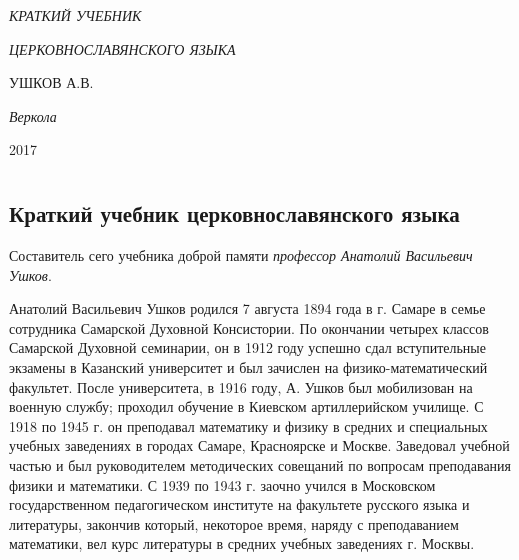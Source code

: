 \documentclass[11pt,a4paper,oneside]{memoir}
\newcommand*{\labelit}[1]{\phantomsection\label{#1}}
\newlength{\tpheight}\setlength{\tpheight}{0.9\textheight}
\newlength{\txtheight}\setlength{\txtheight}{0.9\tpheight}
\newlength{\tpwidth}\setlength{\tpwidth}{0.9\textwidth}
\newlength{\txtwidth}\setlength{\txtwidth}{0.9\tpwidth}
\newlength{\drop}
\newenvironment{showtitle}{%
    \begin{boxminipage}[c][\tpheight]{\tpwidth}
        \centering\begin{vplace}\begin{minipage}[c][\txtheight]{\txtwidth}}%
            {\end{minipage}\end{vplace}\end{boxminipage}}
\newcommand*{\titleCC}{\begingroup%
    \drop=0.1\txtheight
    \vspace*{\drop}
    \centering 
    {\Large\itshape КРАТКИЙ УЧЕБНИК}\\[0.5\drop]
    {\textcolor{Red}{\HUGE\bfseries {\slv{✠}}}}\par
    \vspace{\drop}
    {\LARGE\itshape ЦЕРКОВНОСЛАВЯНСКОГО ЯЗЫКА}\par
    \vfill
    {\Large УШКОВ А.В.}\par
    \vfill
    {\itshape Веркола}\par
    {\scshape 2017}\par
    \vspace*{\drop}
    \endgroup}
\begin{document}
    \begin{titlingpage}
        \begin{showtitle}
            \titleCC
        \end{showtitle}
        \labelit{CC}
        {
            \par\vspace{0.2\baselineskip}
        }
    \end{titlingpage}
    
    \tableofcontents*
    
    \chapter*{}
        \section*{Краткий учебник церковнославянского языка}
        \label{sec:brief}
    
    Составитель сего учебника доброй памяти \emph{профессор Анатолий Васильевич Ушков}.
    
    Анатолий Васильевич Ушков родился 7 августа 1894 года в г. Самаре в семье сотрудника Самарской Духовной Консистории. По окончании четырех классов Самарской Духовной семинарии, он в 1912 году успешно сдал вступительные экзамены в Казанский университет и был зачислен на физико-математический факультет. После университета, в 1916 году, А. Ушков был мобилизован на военную службу; проходил обучение в Киевском артиллерийском училище. С 1918 по 1945 г. он преподавал математику и физику в средних и специальных учебных заведениях в городах Самаре, Красноярске и Москве. Заведовал учебной частью и был руководителем методических совещаний по вопросам преподавания физики и математики. С 1939 по 1943 г. заочно учился в Московском государственном педагогическом институте на факультете русского языка и литературы, закончив который, некоторое время, наряду с преподаванием математики, вел курс литературы в средних учебных заведениях г. Москвы.
    
\end{document}
